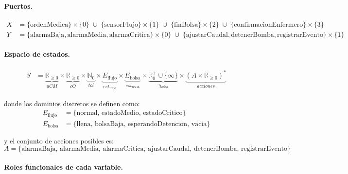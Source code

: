 \documentclass{article}
\begin{document}
\paragraph{Puertos.}
\begin{align*}
  X &= \{\mathrm{ordenMedica}\}\!\times\!\{0\}
       \;\cup\; \{\mathrm{sensorFlujo}\}\!\times\!\{1\}
       \;\cup\; \{\mathrm{finBolsa}\}\!\times\!\{2\}
       \;\cup\; \{\mathrm{confirmacionEnfermero}\}\!\times\!\{3\}
  \\[4pt]
  Y &= \{\mathrm{alarmaBaja},\mathrm{alarmaMedia},\mathrm{alarmaCritica}\}
           \!\times\!\{0\}
       \;\cup\;
       \{\mathrm{ajustarCaudal},\mathrm{detenerBomba},\mathrm{registrarEvento}\}
           \!\times\!\{1\}
\end{align*}

\paragraph{Espacio de estados.}
\begin{align*}
  S &= \underbrace{\mathbb{R}_{\ge 0}}_{\mathit{uCM}}
     \times
     \underbrace{\mathbb{R}_{\ge 0}}_{\mathit{cO}}
     \times
     \underbrace{\mathbb{N}_0}_{\mathit{tol}}
     \times
     \underbrace{E_{\mathrm{flujo}}}_{\mathit{est}_{\mathrm{flujo}}}
     \times
     \underbrace{E_{\mathrm{bolsa}}}_{\mathit{est}_{\mathrm{bolsa}}}
     \times
     \underbrace{\mathbb{R}_0^+ \cup \{\infty\}}_{\tau_{\mathrm{bolsa}}}
     \times
     \underbrace{(A \times \mathbb{R}_{\ge 0})^*}_{\mathit{acciones}}
\end{align*}

donde los dominios discretos se definen como:
\begin{align*}
  E_{\mathrm{flujo}} &= \{\mathrm{normal},\,\mathrm{estadoMedio},\,\mathrm{estadoCritico}\} \\
  E_{\mathrm{bolsa}} &= \{\mathrm{llena},\,\mathrm{bolsaBaja},\,\mathrm{esperandoDetencion},\,\mathrm{vacia}\}
\end{align*}

y el conjunto de acciones posibles es:
\[
  A = \{\mathrm{alarmaBaja},\,\mathrm{alarmaMedia},\,\mathrm{alarmaCritica},\,
        \mathrm{ajustarCaudal},\,\mathrm{detenerBomba},\,\mathrm{registrarEvento}\}
\]

\paragraph{Roles funcionales de cada variable.}
\end{document}
